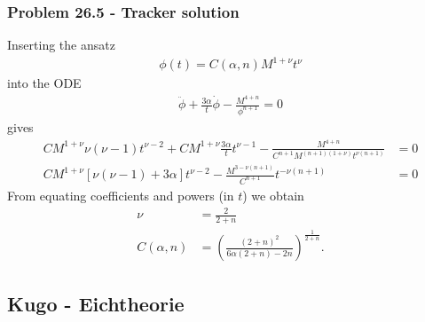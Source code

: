\documentclass[10pt,a4paper]{article}
\theoremstyle{definition}
\begin{document}
\subsubsection{Problem 26.5 - Tracker solution}
Inserting the ansatz
\begin{align}
    \phi(t)=C(\alpha,n)M^{1+\nu}t^\nu
\end{align}
into the ODE
\begin{align}
    \ddot\phi+\frac{3\alpha}{t}\dot\phi-\frac{M^{4+n}}{\phi^{n+1}}=0
\end{align}
gives
\begin{align}
    CM^{1+\nu}\nu(\nu-1)t^{\nu-2}+CM^{1+\nu}\frac{3\alpha}{t}t^{\nu-1}-\frac{M^{4+n}}{C^{n+1}M^{(n+1)(1+\nu)}t^{\nu(n+1)}}&=0\\
    CM^{1+\nu}\left[\nu(\nu-1)+3\alpha\right]t^{\nu-2}-\frac{M^{3-\nu(n+1)}}{C^{n+1}}t^{-\nu(n+1)}&=0
\end{align}
From equating coefficients and powers (in $t$) we obtain
\begin{align}
    \nu&=\frac{2}{2+n}\\
    C(\alpha,n)&=\left(\frac{(2+n)^2}{6\alpha(2+n)-2n}\right)^\frac{1}{2+n}.
\end{align}

\newpage
\subsection{{\sc Kugo} - Eichtheorie}
\end{document}
